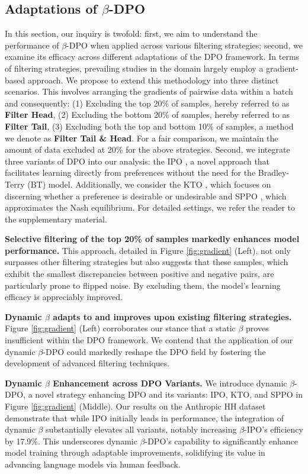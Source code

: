 \subsection{Adaptations of $\beta$-DPO}
\label{exp_adaptation}
In this section, our inquiry is twofold: first, we aim to understand the performance of $\beta$-DPO when applied across various filtering strategies; second, we examine its efficacy across different adaptations of the DPO framework. In terms of filtering strategies, prevailing studies \cite{pruthi2020estimating, xia2024less} in the domain largely employ a gradient-based approach. We propose to extend this methodology into three distinct scenarios. This involves arranging the gradients of pairwise data within a batch and consequently: (1) Excluding the top 20\% of samples, hereby referred to as \textbf{Filter Head},
(2) Excluding the bottom 20\% of samples, hereby referred to as \textbf{Filter Tail},
(3) Excluding both the top and bottom 10\% of samples, a method we denote as \textbf{Filter Tail \& Head}.
For a fair comparison, we maintain the amount of data excluded at 20\% for the above strategies.
Second, we integrate three variants of DPO into our analysis: the IPO \cite{ipo}, a novel approach that facilitates learning directly from preferences without the need for the Bradley-Terry (BT) model. Additionally, we consider the KTO \cite{KTO}, which focuses on discerning whether a preference is desirable or undesirable and SPPO \cite{sppo}, which approximates the Nash equilibrium. For detailed settings, we refer the reader to the supplementary material.

\textbf{Selective filtering of the top 20\% of samples markedly enhances model performance. } This approach, detailed in Figure \ref{fig:gradient} (Left), not only surpasses other filtering strategies but also suggests that these samples, which exhibit the smallest discrepancies between positive and negative pairs, are particularly prone to flipped noise. By excluding them, the model's learning efficacy is appreciably improved.

\textbf{Dynamic $\beta$ adapts to and improves upon existing filtering strategies.} Figure \ref{fig:gradient} (Left) corroborates our stance that a static $\beta$ proves insufficient within the DPO framework. We contend that the application of our dynamic $\beta$-DPO could markedly reshape the DPO field by fostering the development of advanced filtering techniques.

\textbf{Dynamic $\beta$ Enhancement across DPO Variants.}
We introduce dynamic $\beta$-DPO, a novel strategy enhancing DPO and its variants: IPO, KTO, and SPPO in Figure \ref{fig:gradient} (Middle). Our results on the Anthropic HH dataset demonstrate that while IPO initially leads in performance, the integration of dynamic $\beta$ substantially elevates all variants, notably increasing $\beta$-IPO's efficiency by 17.9\%. This underscores dynamic $\beta$-DPO's capability to significantly enhance model training through adaptable improvements, solidifying its value in advancing language models via human feedback.

